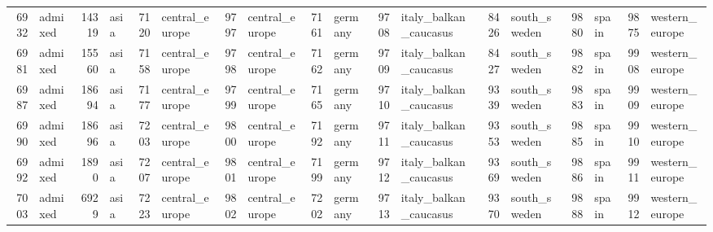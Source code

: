 \begin{table}[h]
{\begin{tabular}{rl|rl|rl|rl|rl|rl|rl|rl|rl}
			6932                   & admixed         & 14319                  & asia            & 7120                   & central\_europe & 9797                   & central\_europe & 7161                   & germany                 & 9708                   & italy\_balkan\_caucasus & 8426                   & south\_sweden   & 9880                   & spain           & \multicolumn{1}{r}{9875} & western\_europe \\
			6981                   & admixed         & 15560                  & asia            & 7158                   & central\_europe & 9798                   & central\_europe & 7162                   & germany                 & 9709                   & italy\_balkan\_caucasus & 8427                   & south\_sweden   & 9882                   & spain           & \multicolumn{1}{r}{9908} & western\_europe \\
			6987                   & admixed         & 18694                  & asia            & 7177                   & central\_europe & 9799                   & central\_europe & 7165                   & germany                 & 9710                   & italy\_balkan\_caucasus & 9339                   & south\_sweden   & 9883                   & spain           & \multicolumn{1}{r}{9909} & western\_europe \\
			6990                   & admixed         & 18696                  & asia            & 7203                   & central\_europe & 9800                   & central\_europe & 7192                   & germany                 & 9711                   & italy\_balkan\_caucasus & 9353                   & south\_sweden   & 9885                   & spain           & \multicolumn{1}{r}{9910} & western\_europe \\
			6992                   & admixed         & 1890                   & asia            & 7207                   & central\_europe & 9801                   & central\_europe & 7199                   & germany                 & 9712                   & italy\_balkan\_caucasus & 9369                   & south\_sweden   & 9886                   & spain           & \multicolumn{1}{r}{9911} & western\_europe \\
			7003                   & admixed         & 6929                   & asia            & 7223                   & central\_europe & 9802                   & central\_europe & 7202                   & germany                 & 9713                   & italy\_balkan\_caucasus & 9370                   & south\_sweden   & 9888                   & spain           & \multicolumn{1}{r}{9912} & western\_europe \\

\end{tabular}}
\end{table}
